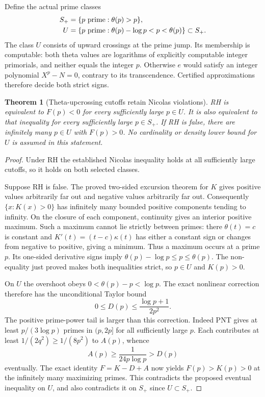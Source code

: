 \documentclass[11pt]{article}
\newtheorem{theorem}{Theorem}[section]
\theoremstyle{definition}
\begin{document}
Define the actual prime classes
\begin{equation}
 \begin{aligned}
 S_+&=\{p\ {\rm prime}:\theta(p)>p\},\\
 U&=\{p\ {\rm prime}:\theta(p)-\log p<p<\theta(p)\}
                                                   \subset S_+ .
 \end{aligned}
 \label{eq:theta-upcrossing-prime-class}
\end{equation}
The class $U$ consists of upward crossings at the prime jump.
Its membership is computable: both theta values are logarithms
of explicitly computable integer primorials, and neither equals
the integer $p$. Otherwise $e$ would satisfy an integer polynomial
$X^p-N=0$, contrary to its transcendence.
Certified approximations therefore decide both strict signs.

\begin{theorem}[Theta-upcrossing cutoffs retain Nicolas violations]
\label{thm:theta-upcrossing-RH-test}
RH is equivalent to $F(p)<0$ for every sufficiently large
$p\in U$. It is also equivalent to that inequality for every
sufficiently large $p\in S_+$.
If RH is false, there are infinitely many $p\in U$ with
$F(p)>0$. No cardinality or density lower bound for $U$ is
assumed in this statement.
\end{theorem}

\begin{proof}
Under RH the established Nicolas inequality holds at all
sufficiently large cutoffs, so it holds on both selected classes.

Suppose RH is false. The proved two-sided excursion theorem
for $K$ gives positive values arbitrarily far out and negative
values arbitrarily far out. Consequently $\{x:K(x)>0\}$ has
infinitely many bounded positive components tending to infinity.
On the closure of each component, continuity gives an interior
positive maximum. Such a maximum cannot lie strictly between
primes: there $\theta(t)=c$ is constant and
$K'(t)=(t-c)\kappa(t)$ has either a constant sign or changes
from negative to positive, giving a minimum.
Thus a maximum occurs at a prime $p$.
Its one-sided derivative signs imply
$\theta(p)-\log p\le p\le\theta(p)$.
The non-equality just proved makes both inequalities strict,
so $p\in U$ and $K(p)>0$.

On $U$ the overshoot obeys $0<\theta(p)-p<\log p$.
The exact nonlinear correction therefore has the unconditional
Taylor bound
\[
 0\le D(p)\le\frac{\log p+1}{2p^2}.
\]
The positive prime-power tail is larger than this correction.
Indeed PNT gives at least $p/(3\log p)$ primes in $(p,2p]$
for all sufficiently large $p$. Each contributes at least
$1/(2q^2)\ge1/(8p^2)$ to $A(p)$, whence
\[
 A(p)\ge\frac1{24p\log p}>D(p)
\]
eventually. The exact identity $F=K-D+A$ now yields
$F(p)>K(p)>0$ at the infinitely many maximizing primes.
This contradicts the proposed eventual inequality on $U$,
and also contradicts it on $S_+$ since $U\subset S_+$.
\end{proof}
\end{document}
